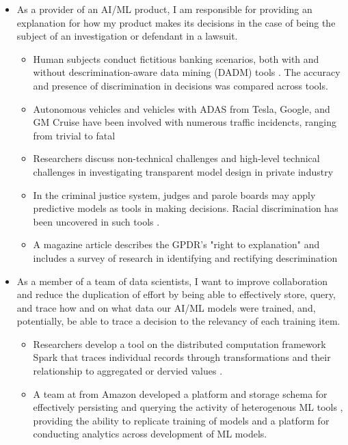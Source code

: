 \documentclass{IEEEtran}
\begin{document}
\begin{itemize}
    \item As a provider of an AI/ML product, I am responsible for providing an explanation for how my product makes its decisions in the case of being the subject of an investigation or defendant in a lawsuit.
    \begin{itemize}
        \item Human subjects conduct fictitious banking scenarios, both with and without descrimination-aware data mining (DADM) tools \cite{Berendt2014}.  The accuracy and presence of discrimination in decisions was compared across tools.
        \item Autonomous vehicles and vehicles with ADAS from Tesla, Google, and GM Cruise have been involved with numerous traffic incidencts, ranging from trivial to fatal \cite{Read2016} \cite{Tesla2018} \cite{Ackerman2016} \cite{Bhavsar2017} 
        \item Researchers discuss non-technical challenges and high-level technical challenges in investigating transparent model design in private industry \cite{Veale:2018:FAD:3173574.3174014}
        \item In the criminal justice system, judges and parole boards may apply predictive models as tools in making decisions.  Racial discrimination has been uncovered in such tools \cite{Wexler.2017} \cite{Angwin2016}.
        \item A magazine article describes the GPDR's "right to explanation" and includes a survey of research in identifying and rectifying descrimination \cite{Goodman2017EuropeanUR}
    \end{itemize}

    \item As a member of a team of data scientists, I want to improve collaboration and reduce the duplication of effort by being able to effectively store, query, and trace how and on what data our  AI/ML models were trained, and, potentially, be able to trace a decision to the relevancy of each training item. 
    \begin{itemize}
        \item Researchers develop a tool on the distributed computation framework Spark that traces individual records through transformations and their relationship to aggregated or dervied values  \cite{Interlandi2017}.
        \item A team at from Amazon developed a platform and storage schema for effectively persisting and querying the activity of heterogenous ML tools \cite{Schelter2017}, providing the ability to replicate training of models and a platform for conducting analytics across development of ML models.
    \end{itemize}
\end{itemize}
\end{document}
